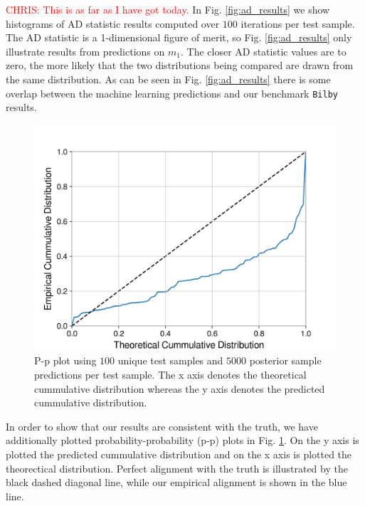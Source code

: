 \documentclass[%
showpacs,
 amsmath,amssymb,
 aps,
 twocolumn,
 prl,
 reprint,
floatfix,
]{revtex4-1}
\newcommand{\chris}[1]{\textcolor{red}{CHRIS: #1}}
\begin{document}
\chris{This is as far as I have got today.} In Fig. \ref{fig:ad_results} we
show histograms of AD statistic results computed over $100$ iterations per test
sample.  The AD statistic is a 1-dimensional figure of merit, so Fig.
\ref{fig:ad_results} only illustrate results from predictions on $m_1$. The
closer AD statistic values are to zero, the more likely that the two
distributions being compared are drawn from the same distribution. As can be
seen in Fig. \ref{fig:ad_results} there is some overlap between the machine
learning predictions and our benchmark \texttt{Bilby} results.

%
%
\begin{figure}
    \includegraphics[width=\columnwidth]{images/latest_pp_plot.png}
    \caption{\label{fig:pp_plot} P-p plot 
    using $100$ unique test samples and $5000$
    posterior sample predictions per test sample. 
    The x axis denotes the theoretical cummulative 
    distribution whereas the y axis denotes 
    the predicted cummulative distribution.}
\end{figure}

In order to show that our results are consistent with the 
truth, we have additionally plotted probability-probability (p-p) 
plots in Fig. \ref{fig:pp_plot}. On the y axis is plotted the predicted 
cummulative distribution and on the x axis is plotted the theorectical 
distribution. Perfect alignment with the truth is illustrated by the 
black dashed diagonal line, while our empirical alignment is 
shown in the blue line. 
\end{document}
